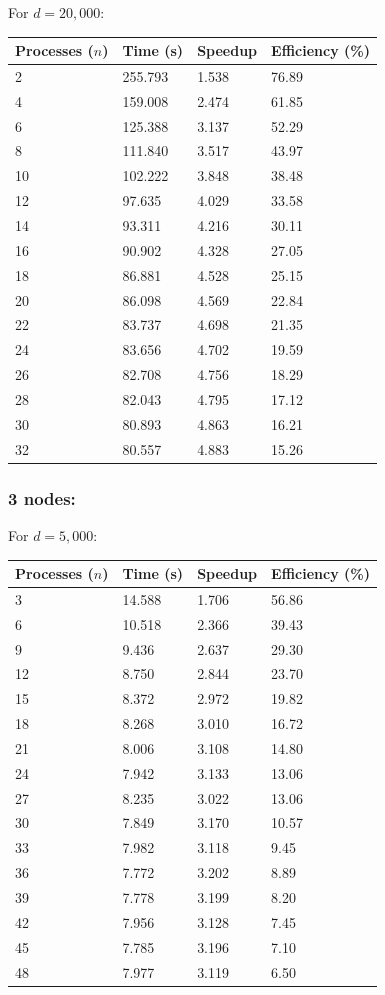 \documentclass[11pt]{article}
\begin{document}
\begin{appendices}
\normalsize{
For $d=20,000$:}
\footnotesize{
\begin{center}
\begin{tabular}{|l|l|l|l|}
\hline
Processes ($n$) & Time (s) & Speedup & Efficiency (\%)\\
\hline
2 & 255.793 & 1.538 & 76.89\\
4 & 159.008 & 2.474 & 61.85\\
6 & 125.388 & 3.137 & 52.29\\
8 & 111.840 & 3.517 & 43.97\\
10 & 102.222 & 3.848 & 38.48\\
12 & 97.635 & 4.029 & 33.58\\
14 & 93.311 & 4.216 & 30.11\\
16 & 90.902 & 4.328 & 27.05\\
18 & 86.881 & 4.528 & 25.15\\
20 & 86.098 & 4.569 & 22.84\\
22 & 83.737 & 4.698 & 21.35\\
24 & 83.656 & 4.702 & 19.59\\
26 & 82.708 & 4.756 & 18.29\\
28 & 82.043 & 4.795 & 17.12\\
30 & 80.893 & 4.863 & 16.21\\
32 & 80.557 & 4.883 & 15.26\\
\hline
\end{tabular}
\end{center}}
\newpage
\subsubsection*{3 nodes:}
\normalsize{
For $d=5,000$:}
\footnotesize{
\begin{center}
\begin{tabular}{|l|l|l|l|}
\hline
Processes ($n$) & Time (s) & Speedup & Efficiency (\%)\\
\hline
3 & 14.588 & 1.706 & 56.86\\
6 & 10.518 & 2.366 & 39.43\\
9 & 9.436 & 2.637 & 29.30\\
12 & 8.750 & 2.844 & 23.70\\
15 & 8.372 & 2.972 & 19.82\\
18 & 8.268 & 3.010 & 16.72\\
21 & 8.006 & 3.108 & 14.80\\
24 & 7.942 & 3.133 & 13.06\\
27 & 8.235 & 3.022 & 13.06\\
30 & 7.849 & 3.170 & 10.57\\
33 & 7.982 & 3.118 & 9.45\\
36 & 7.772 & 3.202 & 8.89\\
39 & 7.778 & 3.199 & 8.20\\
42 & 7.956 & 3.128 & 7.45\\
45 & 7.785 & 3.196 & 7.10\\
48 & 7.977 & 3.119 & 6.50\\
\hline
\end{tabular}
\end{center}}


\end{appendices}
\end{document}
